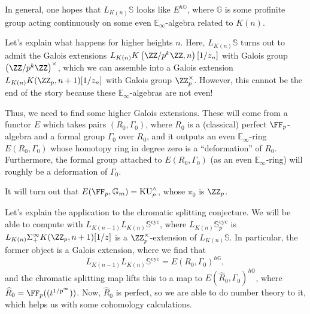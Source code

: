 \documentclass[../notes.tex]{subfiles}
\begin{document}
In general, one hopes that $L_{K(n)}\mathbb S$ looks like $E^{h\mathbb G}$, where $\mathbb G$ is some profinite group acting continuously on some even $\mathbb E_\infty$-algebra related to $K(n)$.
\begin{remark}
	Let's explain what happens for higher heights $n$. Here, $L_{K(n)}\mathbb S$ turns out to admit the Galois extensions $L_{K(n)}K\left(\ZZ/p^k\ZZ,n\right)[1/z_n]$ with Galois group $\left(\ZZ/p^k\ZZ\right)^\times$, which we can assemble into a Galois extension $L_{K(n)}K(\ZZ_p,n+1)[1/z_n]$ with Galois group $\ZZ_p^\times$. However, this cannot be the end of the story because these $\mathbb E_\infty$-algebras are not even!
\end{remark}
Thus, we need to find some higher Galois extensions. These will come from a functor $E$ which takes pairs $(R_0,\Gamma_0)$, where $R_0$ is a (classical) perfect $\FF_p$-algebra and a formal group $\Gamma_0$ over $R_0$, and it outputs an even $\mathbb E_\infty$-ring $E(R_0,\Gamma_0)$ whose homotopy ring in degree zero is a ``deformation'' of $R_0$. Furthermore, the formal group attached to $E(R_0,\Gamma_0)$ (as an even $\mathbb E_\infty$-ring) will roughly be a deformation of $\Gamma_0$.
\begin{example}
	It will turn out that $E(\FF_p,\mathbb G_m)=\mathrm{KU}^\land_p$, whose $\pi_0$ is $\ZZ_p$.
\end{example}
\begin{remark}
	Let's explain the application to the chromatic splitting conjecture. We will be able to compute with $L_{K(n-1)}L_{K(n)}\mathbb S^{\mathrm{cyc}}$, where $L_{K(n)}\mathbb S_p^{\mathrm{cyc}}$ is $L_{K(n)}\Sigma_+^\infty K(\ZZ_p,n+1)[1/z]$ is a $\ZZ_p^\times$-extension of $L_{K(n)}\mathbb S$. In particular, the former object is a Galois extension, where we find that
	\[L_{K(n-1)}L_{K(n)}\mathbb S^{\mathrm{cyc}}=E(R_0,\Gamma_0)^{h\mathbb G},\]
	and the chromatic splitting map lifts this to a map to $E(\widehat R_0,\Gamma_0)^{h\mathbb G}$, where $\widehat R_0=\FF_p((t^{1/p^\infty}))$. Now, $\widehat R_0$ is perfect, so we are able to do number theory to it, which helps us with some cohomology calculations.
\end{remark}
\end{document}
